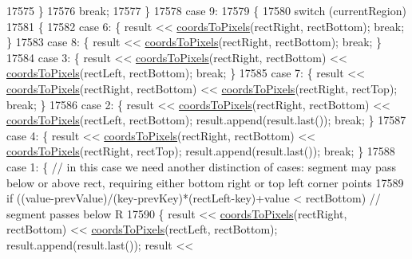 \begin{DoxyCode}
17575       \}
17576       \textcolor{keywordflow}{break};
17577     \}
17578     \textcolor{keywordflow}{case} 9:
17579     \{
17580       \textcolor{keywordflow}{switch} (currentRegion)
17581       \{
17582         \textcolor{keywordflow}{case} 6: \{ result << \hyperlink{class_q_c_p_abstract_plottable_ade710a776104b14c1c835168ce1bfc5c}{coordsToPixels}(rectRight, rectBottom); \textcolor{keywordflow}{break}; \}
17583         \textcolor{keywordflow}{case} 8: \{ result << \hyperlink{class_q_c_p_abstract_plottable_ade710a776104b14c1c835168ce1bfc5c}{coordsToPixels}(rectRight, rectBottom); \textcolor{keywordflow}{break}; \}
17584         \textcolor{keywordflow}{case} 3: \{ result << \hyperlink{class_q_c_p_abstract_plottable_ade710a776104b14c1c835168ce1bfc5c}{coordsToPixels}(rectRight, rectBottom) << 
      \hyperlink{class_q_c_p_abstract_plottable_ade710a776104b14c1c835168ce1bfc5c}{coordsToPixels}(rectLeft, rectBottom); \textcolor{keywordflow}{break}; \}
17585         \textcolor{keywordflow}{case} 7: \{ result << \hyperlink{class_q_c_p_abstract_plottable_ade710a776104b14c1c835168ce1bfc5c}{coordsToPixels}(rectRight, rectBottom) << 
      \hyperlink{class_q_c_p_abstract_plottable_ade710a776104b14c1c835168ce1bfc5c}{coordsToPixels}(rectRight, rectTop); \textcolor{keywordflow}{break}; \}
17586         \textcolor{keywordflow}{case} 2: \{ result << \hyperlink{class_q_c_p_abstract_plottable_ade710a776104b14c1c835168ce1bfc5c}{coordsToPixels}(rectRight, rectBottom) << 
      \hyperlink{class_q_c_p_abstract_plottable_ade710a776104b14c1c835168ce1bfc5c}{coordsToPixels}(rectLeft, rectBottom); result.append(result.last()); \textcolor{keywordflow}{break}; \}
17587         \textcolor{keywordflow}{case} 4: \{ result << \hyperlink{class_q_c_p_abstract_plottable_ade710a776104b14c1c835168ce1bfc5c}{coordsToPixels}(rectRight, rectBottom) << 
      \hyperlink{class_q_c_p_abstract_plottable_ade710a776104b14c1c835168ce1bfc5c}{coordsToPixels}(rectRight, rectTop); result.append(result.last()); \textcolor{keywordflow}{break}; \}
17588         \textcolor{keywordflow}{case} 1: \{ \textcolor{comment}{// in this case we need another distinction of cases: segment may pass below or above
       rect, requiring either bottom right or top left corner points}
17589           \textcolor{keywordflow}{if} ((value-prevValue)/(key-prevKey)*(rectLeft-key)+value < rectBottom) \textcolor{comment}{// segment passes below R}
17590           \{ result << \hyperlink{class_q_c_p_abstract_plottable_ade710a776104b14c1c835168ce1bfc5c}{coordsToPixels}(rectRight, rectBottom) << 
      \hyperlink{class_q_c_p_abstract_plottable_ade710a776104b14c1c835168ce1bfc5c}{coordsToPixels}(rectLeft, rectBottom); result.append(result.last()); result << 

\end{DoxyCode}
